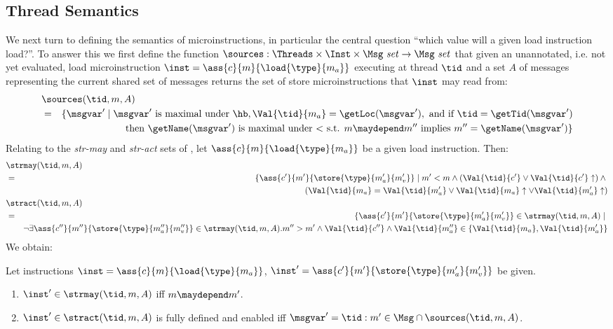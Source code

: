 \subsection{Thread Semantics}
\label{sec:ooo:semantics}
%
We next turn to defining the semantics of microinstructions, in particular the central question ``which value will a given load instruction load?''. To answer this we first define the function $\sources:\Threads \times \Inst\times \Msg\ \mathit{set}\rightarrow \Msg\ \mathit{set}$ that given an unannotated, i.e. not yet evaluated, load microinstruction $\inst = \ass{c}{m}{\load{\type}{m_a}}$ executing at thread $\tid$ and a set $A$ of messages representing the current shared set of messages returns the set of store microinstructions that $\inst$ may read from:
%
\begin{eqnarray*}
\lefteqn{\sources(\tid,m,A)} \\
 & = & 
\{\msgvar' \mid
\msgvar'\mbox{ is maximal under }\hb, \Val{\tid}{m_a} = \getLoc(\msgvar'),\mbox{ and if }\tid = \getTid(\msgvar') \\
 & & \mbox{ then }\getName(\msgvar')\mbox{ is maximal under $<$ s.t. }
m \maydepend m''\mbox{ implies }m''=\getName(\msgvar')
\}
\end{eqnarray*}
%
Relating to the \emph{str-may} and \emph{str-act} sets of \cite{inspectre}, let
$\ass{c}{m}{\load{\type}{m_a}}$ be a given load instruction. Then:
%
\begin{eqnarray*}
\lefteqn{\strmay(\tid,m,A)} \\
 & = & \{\ass{c'}{m'}{\store{\type}{m_a'}{m_v'}}\mid
m' < m \wedge (\Val{\tid}{c'} \vee \Val{\tid}{c'}\uparrow) \wedge \mbox{} \\
 &   & (\Val{\tid}{m_a}=\Val{\tid}{m_a'} \vee \Val{\tid}{m_a}\uparrow \vee
\Val{\tid}{m_a'}\uparrow) \\
\lefteqn{\stract(\tid,m,A)} \\
 & = & \{\ass{c'}{m'}{\store{\type}{m_a'}{m_v'}} \in \strmay(\tid,m,A)\mid\mbox{} \\
 &   & \neg\exists\ass{c''}{m''}{\store{\type}{m_a''}{m_v''}}\in\strmay(\tid,m,A).m''>m'\wedge \Val{\tid}{c''}\wedge \Val{\tid}{m_a''} \in\{\Val{\tid}{m_a},\Val{\tid}{m_a'}\}
\end{eqnarray*}
%
We obtain:
%
\begin{proposition}
Let instructions $\inst=\ass{c}{m}{\load{\type}{m_a}}$,
$\inst' = \ass{c'}{m'}{\store{\type}{m_a'}{m_v'}}$ be given.
\begin{enumerate}
\item $\inst'\in \strmay(\tid,m,A)$ iff
$m\maydepend m'$.
\item $\inst'\in\stract(\tid,m,A)$ is fully defined and enabled iff
$\msgvar' = \tid:m'\in\Msg\cap\sources(\tid,m,A)$. 
\end{enumerate}
\end{proposition}
